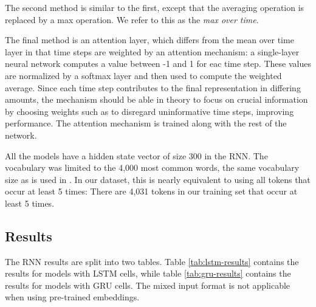 The second method is similar to the first, except that the averaging
operation is replaced by a max operation. We refer to this as the \emph{max
over time}.

The final method is an attention layer, which differs from the mean over
time layer in that time steps are weighted by an attention mechanism: a
single-layer neural network computes a value between -1 and 1 for eac
time step. These values are normalized by a softmax layer and then used to
compute the weighted average. Since each time step contributes to the final
representation in differing amounts, the mechanism should be able in theory
to focus on crucial information by choosing weights such as to disregard
uninformative time steps, improving performance. The attention mechanism is
trained along with the rest of the network.

All the models have a hidden state vector of size 300 in the \ac{RNN}. The
vocabulary was limited to the 4,000 most common words, the same vocabulary
size as is used in \textcite{taghipour16}. In our dataset, this is nearly
equivalent to using all tokens that occur at least 5 times: There are 4,031
tokens in our training set that occur at least 5 times.


\subsection{Results}

The RNN results are split into two tables. Table \ref{tab:lstm-results}
contains the results for models with \ac{LSTM} cells, while table
\ref{tab:gru-results} contains the results for models with \ac{GRU} cells.
The mixed input format is not applicable when using pre-trained embeddings.

